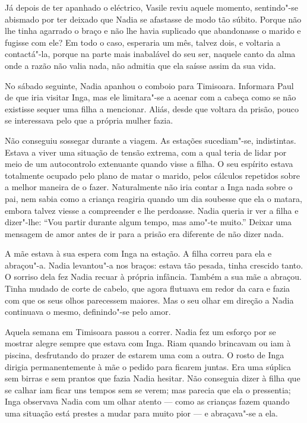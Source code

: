 Já depois de ter apanhado o eléctrico, Vasile reviu aquele momento,
sentindo"-se abismado por ter deixado que Nadia se afastasse de modo tão
súbito. Porque não lhe tinha agarrado o braço e não lhe havia suplicado
que abandonasse o marido e fugisse com ele? Em todo o caso, esperaria um
mês, talvez dois, e voltaria a contactá"-la,
porque na parte mais inabalável do seu ser, naquele canto da alma onde a
razão não valia nada, não admitia que ela saísse assim da sua vida.

\bigskip

No sábado seguinte, Nadia apanhou o comboio para Timisoara. Informara
Paul de que iria visitar Inga, mas ele limitara"-se a acenar com a cabeça
como se não existisse sequer uma filha a mencionar. Aliás, desde que
voltara da prisão, pouco se interessava pelo que a própria mulher fazia.

Não conseguiu sossegar durante a viagem. As estações sucediam"-se,
indistintas. Estava a viver uma situação de tensão extrema, com a qual
teria de lidar por meio de um autocontrolo extenuante quando visse a
filha. O seu espírito estava totalmente ocupado pelo plano de matar o
marido, pelos cálculos repetidos sobre a melhor maneira de o fazer.
Naturalmente não iria contar a Inga nada sobre o pai, nem sabia como a
criança reagiria quando um dia soubesse que ela o matara, embora talvez
viesse a compreender e lhe perdoasse. Nadia queria ir ver a filha e
dizer"-lhe: ``Vou partir durante algum tempo, mas amo"-te muito.'' Deixar
uma mensagem de amor antes de ir para a
prisão era diferente de não dizer nada.

A mãe estava à sua espera com Inga na estação. A filha correu para ela e
abraçou"-a. Nadia levantou"-a nos braços: estava tão pesada, tinha
crescido tanto. O sorriso dela fez Nadia recuar à própria infância.
Também a sua mãe a abraçou. Tinha mudado de corte de cabelo, que agora
flutuava em redor da cara e fazia com que os seus olhos parecessem
maiores. Mas o seu olhar em direção a Nadia continuava o mesmo,
definindo"-se pelo amor.

Aquela semana em Timisoara passou a correr. Nadia fez um esforço por se
mostrar alegre sempre que estava com Inga. Riam quando brincavam ou iam
à piscina, desfrutando do prazer de estarem uma com a outra. O rosto
de Inga dirigia permanentemente à mãe o pedido para ficarem juntas.
Era uma súplica sem birras e sem prantos que fazia Nadia hesitar. Não
conseguia dizer à filha que se calhar iam ficar uns tempos sem se verem;
mas parecia que ela o pressentia; Inga observava Nadia com um olhar
atento --- como as crianças fazem quando uma situação está prestes a
mudar para muito pior --- e abraçava"-se a ela.

